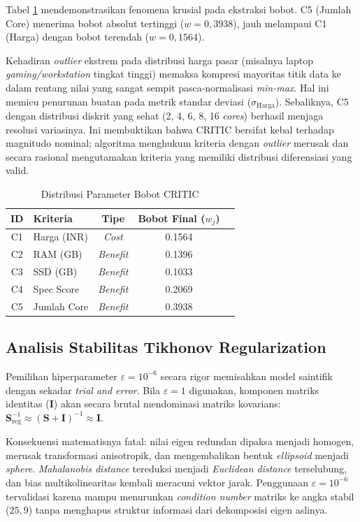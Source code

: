 \documentclass[10pt, a4paper, twocolumn]{article}
\begin{document}
Tabel \ref{tab:bobot} mendemonstrasikan fenomena krusial pada ekstraksi bobot. C5 (Jumlah Core) menerima bobot absolut tertinggi ($w=0{,}3938$), jauh melampaui C1 (Harga) dengan bobot terendah ($w=0{,}1564$). 

Kehadiran \textit{outlier} ekstrem pada distribusi harga pasar (misalnya laptop \textit{gaming/workstation} tingkat tinggi) memaksa kompresi mayoritas titik data ke dalam rentang nilai yang sangat sempit pasca-normalisasi \textit{min-max}. Hal ini memicu penurunan buatan pada metrik standar deviasi ($\sigma_{\text{Harga}}$). Sebaliknya, C5 dengan distribusi diskrit yang sehat (2, 4, 6, 8, 16 \textit{cores}) berhasil menjaga resolusi variasinya. Ini membuktikan bahwa CRITIC bersifat kebal terhadap magnitudo nominal; algoritma menghukum kriteria dengan \textit{outlier} merusak dan secara rasional mengutamakan kriteria yang memiliki distribusi diferensiasi yang valid.

\begin{table}[H]
\centering
\caption{Distribusi Parameter Bobot CRITIC}
\label{tab:bobot}
\small
\begin{tabular}{clccc}
\toprule
\textbf{ID} & \textbf{Kriteria} & \textbf{Tipe} & \textbf{Bobot Final ($w_j$)} \\
\midrule
C1 & Harga (INR) & \textit{Cost} & 0.1564 \\
C2 & RAM (GB) & \textit{Benefit} & 0.1396 \\
C3 & SSD (GB) & \textit{Benefit} & 0.1033 \\
C4 & Spec Score & \textit{Benefit} & 0.2069 \\
C5 & Jumlah Core & \textit{Benefit} & 0.3938 \\
\bottomrule
\end{tabular}
\end{table}

\subsection{Analisis Stabilitas Tikhonov Regularization}

Pemilihan hiperparameter $\varepsilon = 10^{-6}$ secara rigor memisahkan model saintifik dengan sekadar \textit{trial and error}. Bila $\varepsilon = 1$ digunakan, komponen matriks identitas ($\mathbf{I}$) akan secara brutal mendominasi matriks kovarians: $\mathbf{S}_{\text{reg}}^{-1} \approx (\mathbf{S} + \mathbf{I})^{-1} \approx \mathbf{I}$.

Konsekuensi matematisnya fatal: nilai eigen redundan dipaksa menjadi homogen, merusak transformasi anisotropik, dan mengembalikan bentuk \textit{ellipsoid} menjadi \textit{sphere}. \textit{Mahalanobis distance} tereduksi menjadi \textit{Euclidean distance} terselubung, dan bias multikolinearitas kembali meracuni vektor jarak. Penggunaan $\varepsilon = 10^{-6}$ tervalidasi karena mampu menurunkan \textit{condition number} matriks ke angka stabil ($25{,}9$) tanpa menghapus struktur informasi dari dekomposisi eigen aslinya.
\end{document}
